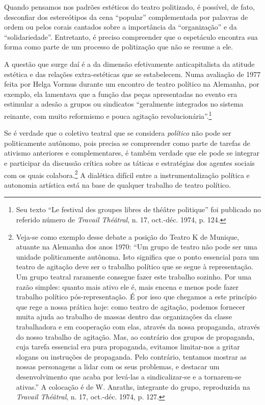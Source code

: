 Quando pensamos nos padrões estéticos do teatro politizado, é possível,
de fato, desconfiar dos estereótipos da cena “popular” complementada por
palavras de ordem ou pelos corais cantados sobre a importância da
“organização” e da “solidariedade”. Entretanto, é preciso compreender
que o espetáculo encontra sua forma como parte de um processo de
politização que não se resume a ele.

A questão que surge daí é a da dimensão efetivamente anticapitalista da
atitude estética e das relações extra-estéticas que se estabelecem. Numa
avaliação de 1977 feita por Helga Vormus durante um encontro de teatro
político na Alemanha, por exemplo, ela lamentava que a função das peças
apresentadas no evento era estimular a adesão a grupos ou sindicatos
“geralmente integrados no sistema reinante, com muito reformismo e pouca
agitação revolucionária”.\footnote{Seu texto “Le festival des groupes
  libres de théâtre politique” foi publicado no referido número de
  \textit{Travail Théâtral}, n. 17, oct.-déc. 1974, p. 124.}

Se é verdade que o coletivo teatral que se considera \textit{político} não
pode ser politicamente autônomo, pois precisa se compreender como parte
de tarefas de ativismo anteriores e complementares, é também verdade que
ele pode se integrar e participar da discussão crítica sobre as táticas
e estratégias dos agentes sociais com os quais colabora.\footnote{Veja-se
  como exemplo desse debate a posição do Teatro K de Munique, atuante na
  Alemanha dos anos 1970: “Um grupo de teatro não pode ser uma unidade
  politicamente autônoma. Isto significa que o ponto essencial para um
  teatro de agitação deve ser o trabalho político que se segue à
  representação. Um grupo teatral raramente consegue fazer este trabalho
  sozinho. Por uma razão simples: quanto mais ativo ele é, mais encena e
  menos pode fazer trabalho político pós-representação. É por isso que
  chegamos a este princípio que rege a nossa prática hoje: como teatro
  de agitação, podemos fornecer muita ajuda ao trabalho de massas dentro
  das organizações da classe trabalhadora e em cooperação com elas,
  através da nossa propaganda, através do nosso trabalho de agitação.
  Mas, ao contrário dos grupos de propaganda, cuja tarefa essencial era
  pura propaganda, evitamos limitar-nos a gritar slogans ou instruções
  de propaganda. Pelo contrário, tentamos mostrar as nossas personagens
  a lidar com os seus problemas, e destacar um desenvolvimento que acaba
  por levá-las a sindicalizar-se e a tornarem-se ativas.” A colocação é
  de W. Anraths, integrante do grupo, reproduzida na \textit{Travail
  Théâtral}, n. 17, oct.-déc. 1974, p. 127.} A dialética difícil entre a
instrumentalização política e autonomia artística está na base de
qualquer trabalho de teatro político.


